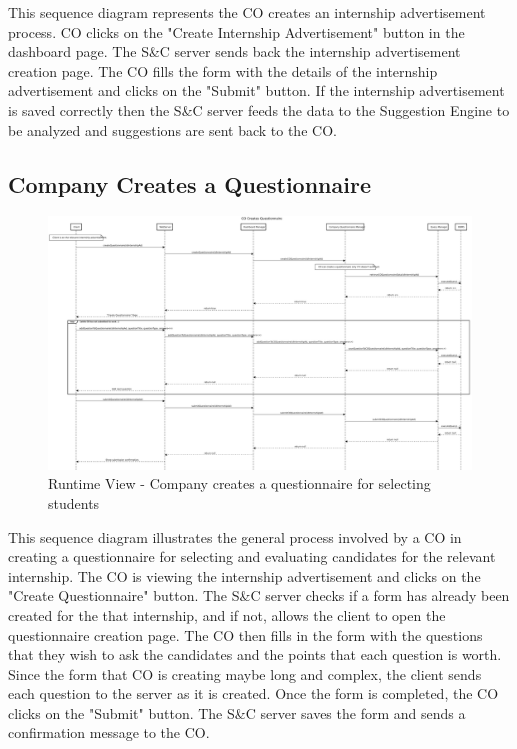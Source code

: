\par This sequence diagram represents the CO creates an internship advertisement process. CO clicks on the "Create Internship
Advertisement" button in the dashboard page. The S\&C server sends back the internship advertisement creation page. The CO fills
the form with the details of the internship advertisement and clicks on the "Submit" button. If the internship advertisement is
saved correctly then the S\&C server feeds the data to the Suggestion Engine to be analyzed and suggestions are sent back to the CO.


\subsection{Company Creates a Questionnaire}
\label{sub:company-creates-a-questionnaire}%

\begin{figure}[H]
      \centering
      \includegraphics[width=1.0\textwidth]{Images/RV_07.pdf}
      \caption{Runtime View - Company creates a questionnaire for selecting students}
      \label{fig:rv-co-creates-questionnaire}
\end{figure}

\par This sequence diagram illustrates the general process involved by a CO in creating a questionnaire for selecting
and evaluating candidates for the relevant internship. The CO is viewing the internship advertisement and clicks on the
"Create Questionnaire" button. The S\&C server checks if a form has already been created for the that internship, and
if not, allows the client to open the questionnaire creation page. The CO then fills in the form with the questions
that they wish to ask the candidates and the points that each question is worth. Since the form that CO is creating
maybe long and complex, the client sends each question to the server as it is created. Once the form is completed, the
CO clicks on the "Submit" button. The S\&C server saves the form and sends a confirmation message to the CO.

